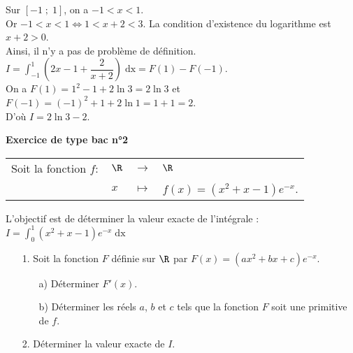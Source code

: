 Sur $\left[-1 \; ; \; 1\right]$, on a $-1 < x < 1$. \\

Or $-1 < x < 1 \Longleftrightarrow 1 < x + 2 < 3$. La condition d'existence du logarithme est $x + 2 > 0$. \\ Ainsi, il n'y a pas de problème de définition. \\

$I = \displaystyle \int_{-1}^1 \left(2x - 1 + \dfrac{2}{x+2}\right) \; \mathrm{dx} = F(1) - F(-1)$. \\

On a $F(1) = 1^2 - 1 + 2\ln 3 = 2 \ln 3$ et $F(-1) = \left(-1\right)^2 + 1 + 2\ln 1 = 1 + 1 = 2$. \\

D'où $I = 2\ln 3 - 2$.

\vspace*{-5cm}

\newpage

\textbf{Exercice de type bac n°2} \\

\begin{tabular}{llll}
Soit la fonction $f:$ & $\R$ & $\longrightarrow$ & $\R$ \\
& $x$ & $\longmapsto$ & $f(x) = \left(x^2 + x - 1\right)e^{-x}$. \\
\end{tabular}

\vspace*{.3cm}

L'objectif est de déterminer la valeur exacte de l'intégrale : $I = \displaystyle \int_0^1 \left(x^2 + x - 1\right)e^{-x} \; \mathrm{dx}$ \\

\begin{itemize}
\item[1.] Soit la fonction $F$ définie sur $\R$ par $F(x) = \left(ax^2 + bx + c\right)e^{-x}$. \\
\begin{itemize}
\item[a)] Déterminer $F'(x)$. 
\item[b)] Déterminer les réels $a$, $b$ et $c$ tels que la fonction $F$ soit une primitive de $f$. \\
\end{itemize}
\item[2.] Déterminer la valeur exacte de $I$. \\
\end{itemize}

